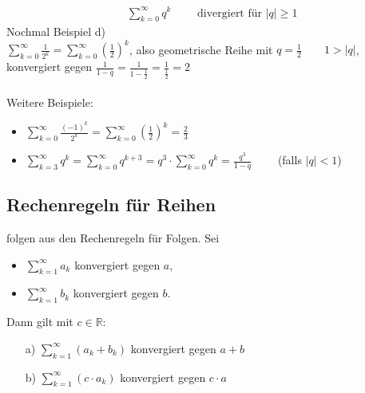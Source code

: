\documentclass[12pt, titlepage]{article}
\newcommand{\R}{\mathds{R}}
\renewcommand{\*}{\cdot}
\begin{document}
\begin{itemize}
\begin{align*}
			&\sum_{k=0}^{\infty}q^k\qquad\textrm{ divergiert für }|q|\geq 1
		\end{align*}
		Nochmal Beispiel d)\\
		$\sum_{k=0}^{\infty}\frac{1}{2^k}=\sum_{k=0}^{\infty}(\frac{1}{2})^k$, also geometrische Reihe mit $q=\frac{1}{2}\qquad1>|q|$, konvergiert gegen $\frac{1}{1-q}=\frac{1}{1-\frac{1}{2}}=\frac{1}{\frac{1}{2}}=2$\\
		\\
		Weitere Beispiele:
		\begin{itemize}
			\item $\sum_{k=0}^{\infty}\frac{(-1)^k}{2^k}=\sum_{k=0}^{\infty}(\frac{1}{2})^k=\frac{2}{3}$
			\item $\sum_{k=3}^{\infty}q^k=\sum_{k=0}^{\infty}q^{k+3}=q^3\*\sum_{k=0}^{\infty}q^k=\frac{q^3}{1-q}\qquad$ (falls $|q|<1$)
		\end{itemize}
	\end{itemize}
		\subsection{Rechenregeln für Reihen}
		folgen aus den Rechenregeln für Folgen. Sei
		\begin{itemize}
			\item $\sum_{k=1}^{\infty}a_k$ konvergiert gegen $a$,
			\item $\sum_{k=1}^{\infty}b_k$ konvergiert gegen $b$.
		\end{itemize}
		Dann gilt mit $c\in\R$:
		\begin{itemize}
			\item[a)] $\sum_{k=1}^{\infty}(a_k+b_k)$ konvergiert gegen $a+b$
			\item[b)] $\sum_{k=1}^{\infty}(c\*a_k)$ konvergiert gegen $c\*a$
		\end{itemize}
\end{document}
